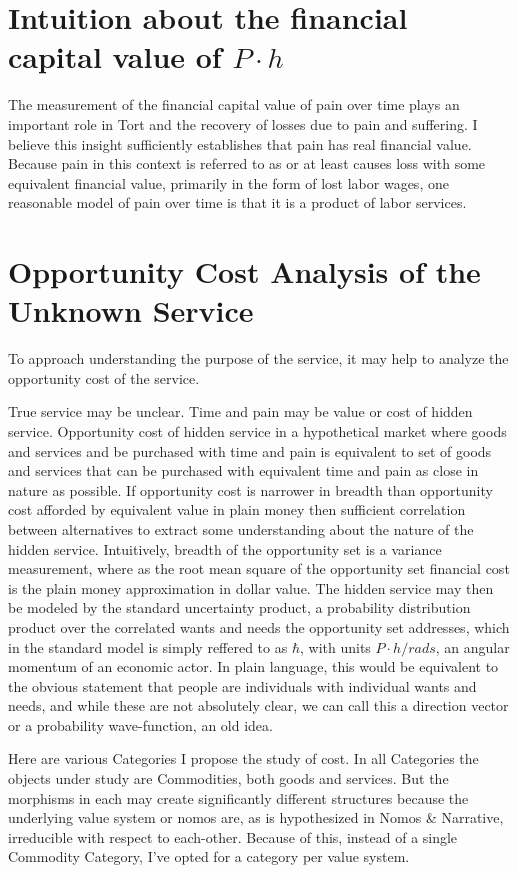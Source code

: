 \documentclass[11pt]{book}
\begin{document}
\section{Intuition about the financial capital value of $P{\cdot}h$}

The measurement of the financial capital value of pain over time plays an important role in Tort and the recovery of losses due to pain and suffering. I believe this insight sufficiently establishes that pain has real financial value. Because pain in this context is referred to as or at least causes loss with some equivalent financial value, primarily in the form of lost labor wages, one reasonable model of pain over time is that it is a product of labor services.

\section{Opportunity Cost Analysis of the Unknown Service}

To approach understanding the purpose of the service, it may help to analyze the opportunity cost of the service.

True service may be unclear. Time and pain may be value or cost of hidden service. Opportunity cost of hidden service in a hypothetical market where goods and services and be purchased with time and pain is equivalent to set of goods and services that can be purchased with equivalent time and pain as close in nature as possible.
If opportunity cost is narrower in breadth than opportunity cost afforded by equivalent value in plain money then sufficient correlation between
alternatives to extract some understanding about the nature of the hidden service. Intuitively, breadth of the opportunity set is a variance
measurement, where as the root mean square of the opportunity set financial cost is the plain money approximation in dollar value. The
hidden service may then be modeled by the standard uncertainty product, a probability distribution product over the correlated
wants and needs the opportunity set addresses, which in the standard model is simply reffered to as ${\hbar}$, with units $P{\cdot}h/rads$, an angular momentum of an economic actor. In plain language, this would be equivalent to the obvious statement that people are individuals with individual wants and needs, and while these are not absolutely clear, we can call this a direction vector or a probability wave-function, an old idea.

Here are various Categories I propose the study of cost. In all Categories the objects under study are Commodities, both goods and services. But the morphisms in each may create significantly different structures because the underlying value system or nomos are, as is hypothesized in Nomos \& Narrative, irreducible with respect to each-other. Because of this, instead of a single Commodity Category, I've opted for a category per value system.
\end{document}
